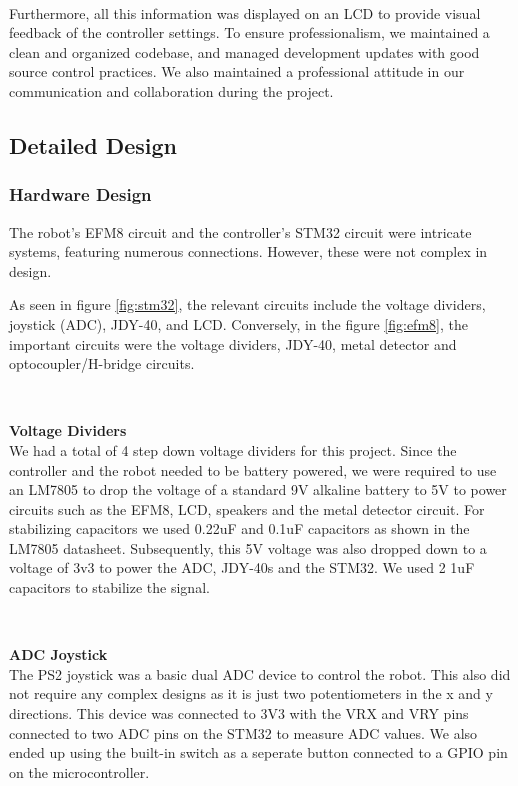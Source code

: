 \documentclass{article}
\begin{document}
\

Furthermore, all this information was displayed on an LCD to provide visual feedback of the controller settings.
To ensure professionalism, we maintained a clean and organized codebase, and managed development updates with good source control practices. We also maintained a professional
attitude in our communication and collaboration during the project.

\subsection{Detailed Design}

\subsubsection{Hardware Design}
The robot's EFM8 circuit and the controller's STM32 circuit were intricate systems, featuring numerous connections. However, these were not complex in design.

As seen in figure \ref{fig:stm32}, the relevant circuits
include the voltage dividers, joystick (ADC), JDY-40, and LCD. Conversely, in the figure \ref{fig:efm8}, the important circuits
were the voltage dividers, JDY-40, metal detector and optocoupler/H-bridge circuits.

\

\textbf{Voltage Dividers} \\
We had a total of 4 step down voltage dividers for this project. Since the controller and the robot needed to be battery powered, we were required to use an LM7805 to drop the voltage of a standard 9V alkaline battery to 5V to power circuits such as the EFM8, LCD, speakers and the metal detector circuit. For stabilizing capacitors we used 0.22uF and 0.1uF capacitors as shown in the LM7805 datasheet. Subsequently, this 5V voltage was also dropped down to a voltage of 3v3 to power the ADC, JDY-40s and the STM32. We used 2 1uF capacitors to stabilize the signal.

\

\textbf{ADC Joystick} \\
The PS2 joystick was a basic dual ADC device to control the robot. This also did not require any complex designs as it is just two potentiometers in the x and y directions. This device was connected to 3V3 with the VRX and VRY pins connected to two ADC pins on the STM32 to measure ADC values. We also ended up using the built-in switch as a seperate button connected to a GPIO pin on the microcontroller.
\end{document}
